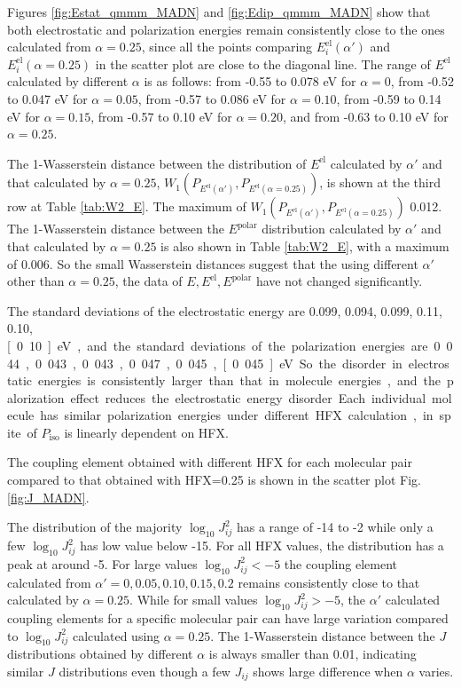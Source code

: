 \documentclass[%
 reprint,
superscriptaddress,
 amsmath,amssymb,
 aps,
prb,
floatfix
]{revtex4-2}
\begin{document}
Figures \ref{fig:Estat_qmmm_MADN} and \ref{fig:Edip_qmmm_MADN} show that both electrostatic and polarization energies remain consistently close to the ones calculated from $\alpha=0.25$, since all the points comparing $E^\text{el}_i(\alpha')$ and $E^\text{el}_i(\alpha=0.25)$ in the scatter plot are close to the diagonal line.
The range of $E^\text{el}$ calculated by different $\alpha$ is as follows:
from  -0.55 to 0.078 eV for $\alpha=0$, 
from  -0.52 to 0.047 eV for $\alpha=0.05$, 
from  -0.57 to 0.086 eV for $\alpha=0.10$, 
from  -0.59 to 0.14 eV for $\alpha=0.15$, 
from  -0.57 to 0.10 eV for $\alpha=0.20$, 
and from -0.63 to 0.10 eV for $\alpha=0.25$.


The 1-Wasserstein distance between the distribution of $E^\text{el}$ calculated by $\alpha'$ and that calculated by $\alpha=0.25$, $W_1(P_{E^\text{el}(\alpha')}, P_{E^\text{el}(\alpha=0.25)})$, is shown at the third row at Table \ref{tab:W2_E}. 
The maximum of $W_1(P_{E^\text{el}(\alpha')}, P_{E^\text{el}(\alpha=0.25)})$ 0.012. The 1-Wasserstein distance between the $E^\text{polar}$ distribution calculated by $\alpha'$ and that calculated by $\alpha=0.25$ is also shown in Table \ref{tab:W2_E}, with a maximum of 0.006. So the small Wasserstein distances suggest that the using different $\alpha'$ other than $\alpha=0.25$, the data of $E, E^\text{el}, E^\text{polar}$ have not changed significantly.

The standard deviations of the electrostatic energy are 0.099, 0.094, 0.099, 0.11, 0.10, \unit[0.10]{eV}, and the standard deviations of the polarization energies are 0.044, 0.043, 0.043, 0.047, 0.045, \unit[0.045]{eV}. So the disorder in electrostatic energies is consistently larger than that in molecule energies, and the palorization effect reduces the electrostatic energy disorder. 
Each individual molecule has similar polarization energies under different HFX calculation, in spite of $P_\text{iso}$ is linearly dependent on HFX. 

The coupling element obtained with different HFX for each molecular pair compared to that obtained with HFX=0.25 is shown in the scatter plot Fig. \ref{fig:J_MADN}.


The distribution of the majority $\log_{10} J_{ij}^2$ has a range of -14 to -2 while only a few $\log_{10} J_{ij}^2$ has low value below -15. For all HFX values, the distribution has a peak at around -5. 
For large values $\log_{10} J_{ij}^2 < -5$ the coupling element calculated from $\alpha'=0, 0.05, 0.10, 0.15, 0.2$ remains consistently close to that calculated by $\alpha=0.25$. While for small values $\log_{10} J_{ij}^2 > -5$, the $\alpha'$ calculated coupling elements for a specific molecular pair can have large variation compared to $\log_{10} J_{ij}^2$ calculated using $\alpha=0.25$.
The 1-Wasserstein distance between the $J$ distributions obtained by different $\alpha$ is always smaller than 0.01,  
indicating similar $J$ distributions even though a few $J_{ij}$ shows large difference when $\alpha$ varies. 
\end{document}
